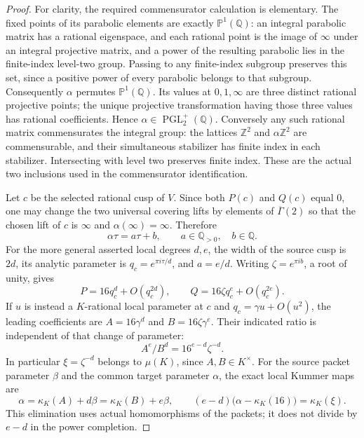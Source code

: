 \begin{proof}
For clarity, the required commensurator calculation is elementary.
The fixed points of its parabolic elements are exactly
$\mathbb P^1(\mathbb Q)$: an integral parabolic matrix has a
rational eigenspace, and each rational point is the image
of $\infty$ under an integral projective matrix, and a power
of the resulting parabolic lies in the finite-index level-two
group. Passing to any finite-index subgroup preserves this set,
since a positive power of every parabolic belongs to that
subgroup. Consequently $\alpha$ permutes
$\mathbb P^1(\mathbb Q)$. Its values at $0,1,\infty$ are
three distinct rational projective points; the unique projective
transformation having those three values has rational
coefficients. Hence
$\alpha\in\operatorname{PGL}_2^+(\mathbb Q)$.
Conversely any such rational matrix commensurates the integral
group: the lattices $\mathbb Z^2$ and $\alpha\mathbb Z^2$
are commensurable, and their simultaneous stabilizer has finite
index in each stabilizer. Intersecting with level two preserves
finite index. These are the actual two inclusions used in
the commensurator identification.

Let $c$ be the selected rational cusp of $V$. Since both
$P(c)$ and $Q(c)$ equal $0$, one may change the two universal
covering lifts by elements of $\overline\Gamma(2)$ so that
the chosen lift of $c$ is $\infty$ and
$\alpha(\infty)=\infty$. Therefore
\[
                \alpha\tau=a\tau+b,
                 \qquad a\in\mathbb Q_{>0},\quad b\in\mathbb Q.
\]
For the more general asserted local degrees $d,e$, the width
of the source cusp is $2d$, its analytic parameter is
$q_c=e^{\pi i\tau/d}$, and $a=e/d$. Writing
$\zeta=e^{\pi i b}$, a root of unity, gives
\[
                 P=16q_c^d+O(q_c^{2d}),\qquad
                 Q=16\zeta q_c^e+O(q_c^{2e}).
 \tag{F.46.4}
\]
If $u$ is instead a $K$-rational local parameter at $c$ and
$q_c=\gamma u+O(u^2)$, the leading coefficients are
$A=16\gamma^d$ and $B=16\zeta\gamma^e$. Their indicated
ratio is independent of that change of parameter:
\[
               A^e/B^d=16^{e-d}\zeta^{-d}.
 \tag{F.46.5}
\]
In particular $\xi=\zeta^{-d}$ belongs to $\mu(K)$, since
$A,B\in K^\times$. For the source packet parameter $\beta$
and the common target parameter $\alpha$, the exact local
Kummer maps are
\[
 \alpha=\kappa_K(A)+d\beta=\kappa_K(B)+e\beta,
 \qquad
 (e-d)\bigl(\alpha-\kappa_K(16)\bigr)=\kappa_K(\xi).
 \tag{F.46.6}
\]
This elimination uses actual homomorphisms of the packets; it
does not divide by $e-d$ in the power completion.


\end{proof}
